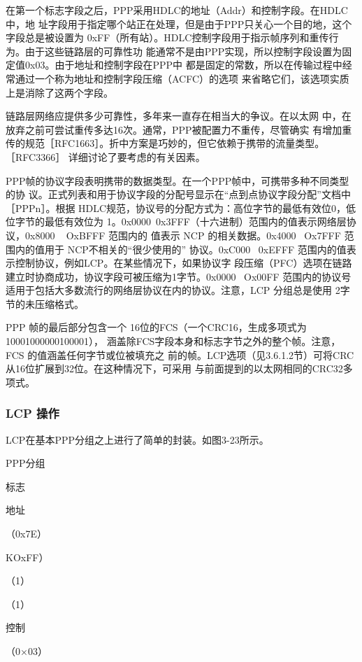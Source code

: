在第一个标志字段之后，PPP采用HDLC的地址（Addr）和控制字段。在HDLC中，地
址字段用于指定哪个站正在处理，但是由于PPP只关心一个目的地，这个字段总是被设置为
0xFF（所有站）。HDLC控制字段用于指示帧序列和重传行为。由于这些链路层的可靠性功
能通常不是由PPP实现，所以控制字段设置为固定值0x03。由于地址和控制字段在PPP中
都是固定的常数，所以在传输过程中经常通过一个称为地址和控制字段压缩（ACFC）的选项
来省略它们，该选项实质上是消除了这两个字段。

\begin{tcolorbox}
    链路层网络应提供多少可靠性，多年来一直存在相当大的争议。在以太网
    中，在放弃之前可尝试重传多达16次。通常，PPP被配置力不重传，尽管确实
    有增加重传的规范［RFC1663］。折中方案是巧妙的，但它依赖于携带的流量类型。
    ［RFC3366］ 详细讨论了要考虑的有关因素。
\end{tcolorbox}

PPP帧的协议字段表明携带的数据类型。在一个PPP帧中，可携带多种不同类型的协
议。正式列表和用于协议字段的分配号显示在“点到点协议字段分配”文档中［PPPn］。根据
HDLC规范，协议号的分配方式为：高位字节的最低有效位0，低位字节的最低有效位为
1。0x0000~0x3FFF（十六进制）范围内的值表示网络层协议，0x8000 ~ OxBFFF 范围内的
值表示 NCP 的相关数据。0x4000~ Ox7FFF 范围内的值用于 NCP不相关的“很少使用的”
协议。0xC000~ 0xEFFF 范围内的值表示控制协议，例如LCP。在某些情况下，如果协议字
段压缩（PFC）选项在链路建立时协商成功，协议字段可被压缩为1字节。0x0000~ Ox00FF
范围内的协议号适用于包括大多数流行的网络层协议在内的协议。注意，LCP 分组总是使用
2字节的未压缩格式。

PPP 帧的最后部分包含一个 16位的FCS（一个CRC16，生成多项式为10001000000100001），
涵盖除FCS字段本身和标志字节之外的整个帧。注意，FCS 的值涵盖任何字节或位被填充之
前的帧。LCP选项（见3.6.1.2节）可将CRC从16位扩展到32位。在这种情况下，可采用
与前面提到的以太网相同的CRC32多项式。

\subsubsection{LCP 操作}

LCP在基本PPP分组之上进行了简单的封装。如图3-23所示。

PPP分组

标志

地址

（0x7E）

KOxFF）

（1）

（1）

控制

（0×03）

